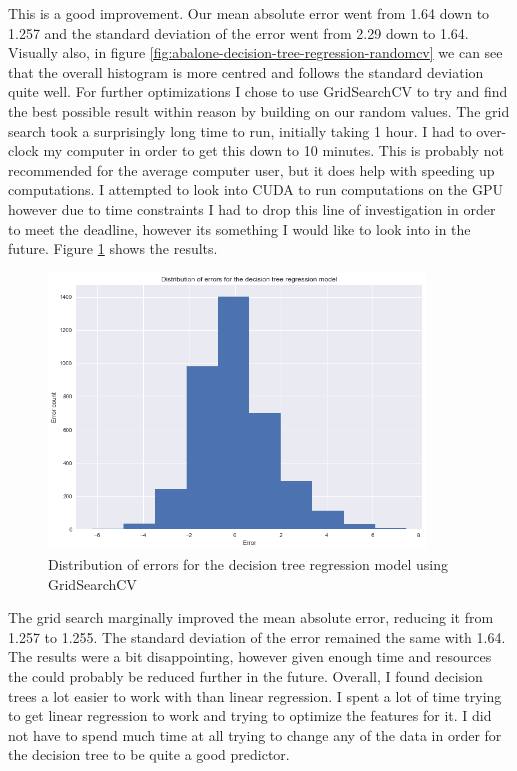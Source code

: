 This is a good improvement. Our mean absolute error went from 1.64 down to 1.257 and the standard deviation of the error went from 2.29 down to 1.64. Visually also, in figure \ref{fig:abalone-decision-tree-regression-randomcv} we can see that the overall histogram is more centred and follows the standard deviation quite well. 
For further optimizations I chose to use GridSearchCV to try and find the best possible result within reason by building on our random values. The grid search took a surprisingly long time to run, initially taking 1 hour. I had to over-clock my computer in order to get this down to 10 minutes. This is probably not recommended for the average computer user, but it does help with speeding up computations. I attempted to look into CUDA to run computations on the GPU\cite{6024507} however due to time constraints I had to drop this line of investigation in order to meet the deadline, however its something I would like to look into in the future. Figure \ref{fig:abalone-decision-tree-regression-gridcv} shows the results. 

\begin{figure}[H]
  \centering
  \includegraphics[scale=0.5,width=100mm]{./images/abalone-decision-tree-regression-gridcv.png}
  \caption{Distribution of errors for the decision tree regression model using GridSearchCV}
  \label{fig:abalone-decision-tree-regression-gridcv}
\end{figure}

The grid search marginally improved the mean absolute error, reducing it from 1.257 to 1.255. The standard deviation of the error remained the same with 1.64. The results were a bit disappointing, however given enough time and resources the could probably be reduced further in the future.
Overall, I found decision trees a lot easier to work with than linear regression. I spent a lot of time trying to get linear regression to work and trying to optimize the features for it. I did not have to spend much time at all trying to change any of the data in order for the decision tree to be quite a good predictor.